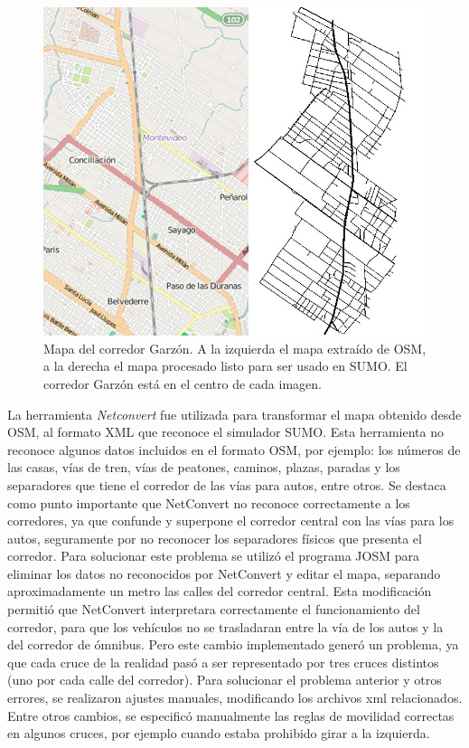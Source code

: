 \begin{figure}[H]
	\centering
	\includegraphics[width=0.9\linewidth]{Figures/mapa_osm_sumo}
	\caption[Mapa del corredor Garzón]{Mapa del corredor Garzón. A la izquierda el mapa extraído de OSM, a la derecha el mapa procesado listo para ser usado en SUMO. El corredor Garzón está en el centro de cada imagen.}
	\label{fig:mapa_osm_sumo}
\end{figure}

La herramienta \emph{Netconvert} fue utilizada para transformar el mapa obtenido desde OSM, al formato XML que reconoce el simulador SUMO. Esta herramienta no reconoce algunos datos incluidos en el formato OSM, por ejemplo: los números de las casas, vías de tren, vías de peatones, caminos, plazas, paradas y los separadores que tiene el corredor de las vías para autos, entre otros. Se destaca como punto importante que NetConvert no reconoce correctamente a los corredores, ya que confunde y superpone el corredor central con las vías para los autos, seguramente por no reconocer los separadores físicos que presenta el corredor. Para solucionar este problema se utilizó el programa JOSM para eliminar los datos no reconocidos por NetConvert y editar el mapa, separando aproximadamente un metro las calles del corredor central. Esta modificación permitió que NetConvert interpretara correctamente el funcionamiento del corredor, para que los vehículos no se trasladaran entre la vía de los autos y la del corredor de ómnibus. Pero este cambio implementado generó un problema, ya que cada cruce de la realidad pasó a ser representado por tres cruces distintos (uno por cada calle del corredor). Para solucionar el problema anterior y otros errores, se realizaron ajustes manuales, modificando los archivos xml relacionados. Entre otros cambios, se especificó manualmente las reglas de movilidad correctas en algunos cruces, por ejemplo cuando estaba prohibido girar  a la izquierda.

